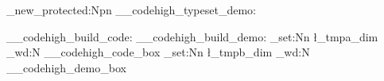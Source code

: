 \documentclass{article}
\begin{document}
\begin{codehigh}[language=latex/latex3]
\cs_new_protected:Npn \__codehigh_typeset_demo:
  {
  \__codehigh_build_code:
  \__codehigh_build_demo:
  \dim_set:Nn \l_tmpa_dim { \box_wd:N \g__codehigh_code_box }
  \dim_set:Nn \l_tmpb_dim { \box_wd:N \g__codehigh_demo_box }
  \par\addvspace{0.5em}\noindent
}
\end{codehigh}
\end{document}
